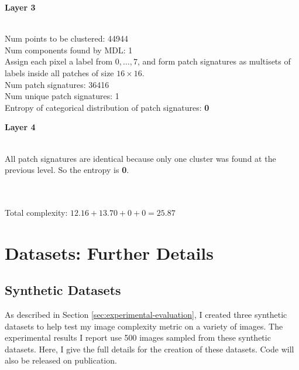 \noindent \begin{large} \textbf{Layer 3} \end{large} \\
Num points to be clustered: 44944 \\
Num components found by MDL: 1 \\
Assign each pixel a label from $0, \dots, 7$, and form patch signatures as multisets of labels inside all patches of size $16 \times 16$. \\
Num patch signatures: 36416 \\
Num unique patch signatures: 1 \\
Entropy of categorical distribution of patch signatures: \textbf{0} \\

\noindent \begin{large} \textbf{Layer 4} \end{large} \\
All patch signatures are identical because only one cluster was found at the previous level. So the entropy is \textbf{0}.
\begin{large}
\\
\\
Total complexity: $12.16 + 13.70 + 0 + 0 = \boldsymbol{25.87}$
\end{large}
\clearpage



\section{Datasets: Further Details}
\subsection{Synthetic Datasets}
As described in Section \ref{sec:experimental-evaluation}, I created three synthetic datasets to help test my image complexity metric on a variety of images. The experimental results I report use 500 images sampled from these synthetic datasets. Here, I give the full details for the creation of these datasets. Code will also be released on publication.

